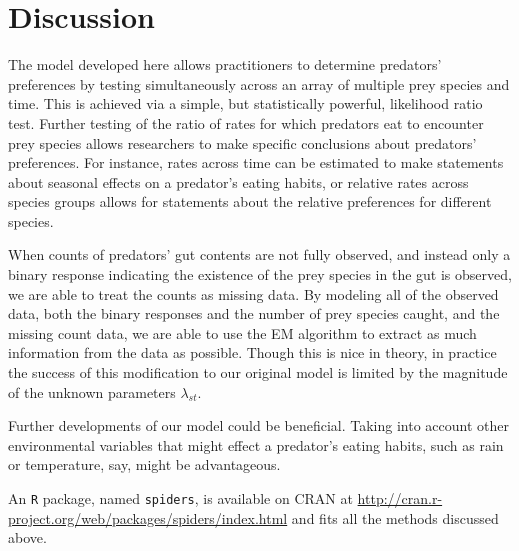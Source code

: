 \section{Discussion}
\label{sec:discussion}

The model developed here allows practitioners to determine predators' preferences by testing simultaneously across an array of multiple prey species and time.  This is achieved via a simple, but statistically powerful, likelihood ratio test.  Further testing of the ratio of rates for which predators eat to encounter prey species allows researchers to make specific conclusions about predators' preferences.  For instance, rates across time can be estimated to make statements about seasonal effects on a predator's eating habits, or relative rates across species groups allows for statements about the relative preferences for different species.

When counts of predators' gut contents are not fully observed, and instead only a binary response indicating the existence of the prey species in the gut is observed, we are able to treat the counts as missing data.  By modeling all of the observed data, both the binary responses and the number of prey species caught, and the missing count data, we are able to use the EM algorithm to extract as much information from the data as possible.  Though this is nice in theory, in practice the success of this modification to our original model is limited by the magnitude of the unknown parameters $\lambda_{st}$.  

Further developments of our model could be beneficial.  Taking into account other environmental variables that might effect a predator's eating habits, such as rain or temperature, say, might be advantageous.  

An \texttt{R} package, named \texttt{spiders}, is available on CRAN at \url{http://cran.r-project.org/web/packages/spiders/index.html} and fits all the methods discussed above.  

